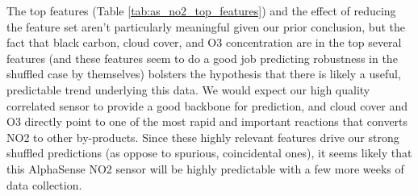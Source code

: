 The top features  (Table \ref{tab:as_no2_top_features}) and the effect of reducing the feature set aren't particularly meaningful given our prior conclusion, but the fact that black carbon, cloud cover, and O3 concentration are in the top several features (and these features seem to do a good job predicting robustness in the shuffled case by themselves) bolsters the hypothesis that there is likely a useful, predictable trend underlying this data.  We would expect our high quality correlated sensor to provide a good backbone for prediction, and cloud cover and O3 directly point to one of the most rapid and important reactions that converts NO2 to other by-products.  Since these highly relevant features drive our strong shuffled predictions (as oppose to spurious, coincidental ones),  it seems likely that this AlphaSense NO2 sensor will be highly predictable with a few more weeks of data collection.

